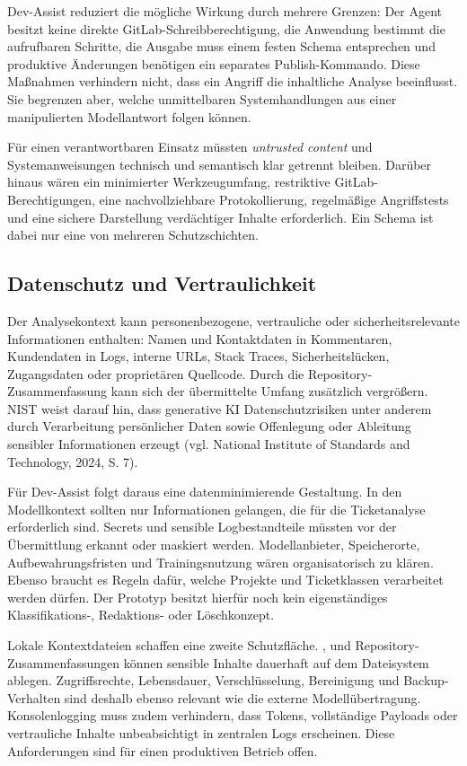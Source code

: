 Dev-Assist reduziert die mögliche Wirkung durch mehrere Grenzen: Der Agent besitzt keine direkte GitLab-Schreibberechtigung, die Anwendung bestimmt die aufrufbaren Schritte, die Ausgabe muss einem festen Schema entsprechen und produktive Änderungen benötigen ein separates Publish-Kommando. Diese Maßnahmen verhindern nicht, dass ein Angriff die inhaltliche Analyse beeinflusst. Sie begrenzen aber, welche unmittelbaren Systemhandlungen aus einer manipulierten Modellantwort folgen können.

Für einen verantwortbaren Einsatz müssten \emph{untrusted content} und Systemanweisungen technisch und semantisch klar getrennt bleiben. Darüber hinaus wären ein minimierter Werkzeugumfang, restriktive GitLab-Berechtigungen, eine nachvollziehbare Protokollierung, regelmäßige Angriffstests und eine sichere Darstellung verdächtiger Inhalte erforderlich. Ein Schema ist dabei nur eine von mehreren Schutzschichten.

\subsection{Datenschutz und Vertraulichkeit}

Der Analysekontext kann personenbezogene, vertrauliche oder sicherheitsrelevante Informationen enthalten: Namen und Kontaktdaten in Kommentaren, Kundendaten in Logs, interne URLs, Stack Traces, Sicherheitslücken, Zugangsdaten oder proprietären Quellcode. Durch die Repository-Zusammenfassung kann sich der übermittelte Umfang zusätzlich vergrößern. NIST weist darauf hin, dass generative KI Datenschutzrisiken unter anderem durch Verarbeitung persönlicher Daten sowie Offenlegung oder Ableitung sensibler Informationen erzeugt (vgl. National Institute of Standards and Technology, 2024, S. 7).

Für Dev-Assist folgt daraus eine datenminimierende Gestaltung. In den Modellkontext sollten nur Informationen gelangen, die für die Ticketanalyse erforderlich sind. Secrets und sensible Logbestandteile müssten vor der Übermittlung erkannt oder maskiert werden. Modellanbieter, Speicherorte, Aufbewahrungsfristen und Trainingsnutzung wären organisatorisch zu klären. Ebenso braucht es Regeln dafür, welche Projekte und Ticketklassen verarbeitet werden dürfen. Der Prototyp besitzt hierfür noch kein eigenständiges Klassifikations-, Redaktions- oder Löschkonzept.

Lokale Kontextdateien schaffen eine zweite Schutzfläche. ,  und Repository-Zusammenfassungen können sensible Inhalte dauerhaft auf dem Dateisystem ablegen. Zugriffsrechte, Lebensdauer, Verschlüsselung, Bereinigung und Backup-Verhalten sind deshalb ebenso relevant wie die externe Modellübertragung. Konsolenlogging muss zudem verhindern, dass Tokens, vollständige Payloads oder vertrauliche Inhalte unbeabsichtigt in zentralen Logs erscheinen. Diese Anforderungen sind für einen produktiven Betrieb offen.

